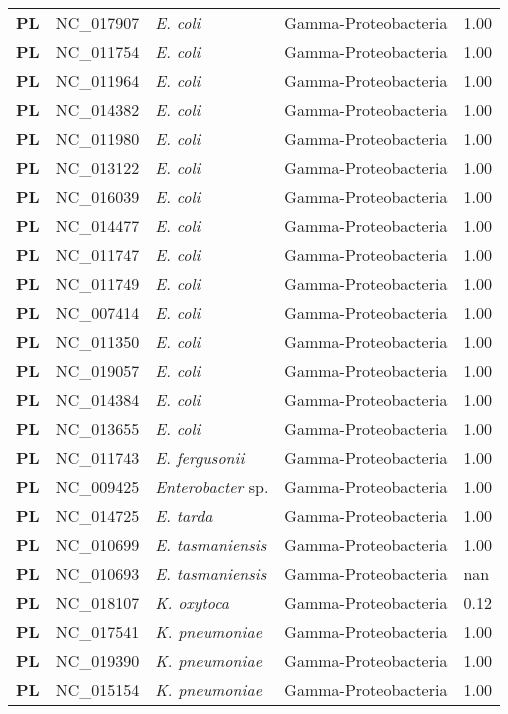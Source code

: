 \begin{adjustwidth}{-3cm}{2cm}
{\begin{supertabular}{>{\bfseries}l|p{0.1\textwidth}p{0.14\textwidth}l|l}
PL & NC\_017907 & \textit{E. coli} & Gamma-Proteobacteria & 1.00\\
PL & NC\_011754 & \textit{E. coli} & Gamma-Proteobacteria & 1.00\\
PL & NC\_011964 & \textit{E. coli} & Gamma-Proteobacteria & 1.00\\
PL & NC\_014382 & \textit{E. coli} & Gamma-Proteobacteria & 1.00\\
PL & NC\_011980 & \textit{E. coli} & Gamma-Proteobacteria & 1.00\\
PL & NC\_013122 & \textit{E. coli} & Gamma-Proteobacteria & 1.00\\
PL & NC\_016039 & \textit{E. coli} & Gamma-Proteobacteria & 1.00\\
PL & NC\_014477 & \textit{E. coli} & Gamma-Proteobacteria & 1.00\\
PL & NC\_011747 & \textit{E. coli} & Gamma-Proteobacteria & 1.00\\
PL & NC\_011749 & \textit{E. coli} & Gamma-Proteobacteria & 1.00\\
PL & NC\_007414 & \textit{E. coli} & Gamma-Proteobacteria & 1.00\\
PL & NC\_011350 & \textit{E. coli} & Gamma-Proteobacteria & 1.00\\
PL & NC\_019057 & \textit{E. coli} & Gamma-Proteobacteria & 1.00\\
PL & NC\_014384 & \textit{E. coli} & Gamma-Proteobacteria & 1.00\\
PL & NC\_013655 & \textit{E. coli} & Gamma-Proteobacteria & 1.00\\
PL & NC\_011743 & \textit{E. fergusonii} & Gamma-Proteobacteria & 1.00\\
PL & NC\_009425 & \textit{Enterobacter} sp. & Gamma-Proteobacteria & 1.00\\
PL & NC\_014725 & \textit{E. tarda} & Gamma-Proteobacteria & 1.00\\
PL & NC\_010699 & \textit{E. tasmaniensis} & Gamma-Proteobacteria & 1.00\\
PL & NC\_010693 & \textit{E. tasmaniensis} & Gamma-Proteobacteria & nan\\
PL & NC\_018107 & \textit{K. oxytoca} & Gamma-Proteobacteria & 0.12\\
PL & NC\_017541 & \textit{K. pneumoniae} & Gamma-Proteobacteria & 1.00\\
PL & NC\_019390 & \textit{K. pneumoniae} & Gamma-Proteobacteria & 1.00\\
PL & NC\_015154 & \textit{K. pneumoniae} & Gamma-Proteobacteria & 1.00\\

\end{supertabular}}
\end{adjustwidth}
